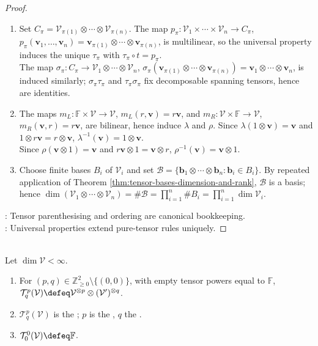 \begin{theorem}
\begin{proof}
\begin{enumerate}[label=(\roman*)]
\item Set $C_\pi=\mathcal{V}_{\pi(1)}\otimes\cdots\otimes\mathcal{V}_{\pi(n)}$. The map $p_\pi:\mathcal{V}_1\times\cdots\times\mathcal{V}_n\to C_\pi$, $p_\pi(\mathbf{v}_1,\ldots,\mathbf{v}_n)=\mathbf{v}_{\pi(1)}\otimes\cdots\otimes\mathbf{v}_{\pi(n)}$, is multilinear, so the universal property induces the unique $\tau_\pi$ with $\tau_\pi\circ t=p_\pi$.\\
The map $\sigma_\pi:C_\pi\to\mathcal{V}_1\otimes\cdots\otimes\mathcal{V}_n$, $\sigma_\pi(\mathbf{v}_{\pi(1)}\otimes\cdots\otimes\mathbf{v}_{\pi(n)})=\mathbf{v}_1\otimes\cdots\otimes\mathbf{v}_n$, is induced similarly; $\sigma_\pi\tau_\pi$ and $\tau_\pi\sigma_\pi$ fix decomposable spanning tensors, hence are identities.
\item The maps $m_L:\mathbb{F}\times\mathcal{V}\to\mathcal{V}$, $m_L(r,\mathbf{v})=r\mathbf{v}$, and $m_R:\mathcal{V}\times\mathbb{F}\to\mathcal{V}$, $m_R(\mathbf{v},r)=r\mathbf{v}$, are bilinear, hence induce $\lambda$ and $\rho$. Since $\lambda(1\otimes\mathbf{v})=\mathbf{v}$ and $1\otimes r\mathbf{v}=r\otimes\mathbf{v}$, $\lambda^{-1}(\mathbf{v})=1\otimes\mathbf{v}$.\\
Since $\rho(\mathbf{v}\otimes1)=\mathbf{v}$ and $r\mathbf{v}\otimes1=\mathbf{v}\otimes r$, $\rho^{-1}(\mathbf{v})=\mathbf{v}\otimes1$.
\item Choose finite bases $B_i$ of $\mathcal{V}_i$ and set $\mathcal{B}=\{\mathbf{b}_1\otimes\cdots\otimes\mathbf{b}_n:\mathbf{b}_i\in B_i\}$. By repeated application of Theorem \ref{thm:tensor-bases-dimension-and-rank}, $\mathcal{B}$ is a basis; hence $\dim(\mathcal{V}_1\otimes\cdots\otimes\mathcal{V}_n)=\#\mathcal{B}=\prod_{i=1}^{n}\#B_i=\prod_{i=1}^{n}\dim\mathcal{V}_i$.
\end{enumerate}
: Tensor parenthesising and ordering are canonical bookkeeping.\\
: Universal properties extend pure-tensor rules uniquely.
\end{proof}
\end{theorem}

\begin{definition} \label{def:tensor-spaces-type-pq} \\
Let $\dim\mathcal{V}<\infty$.
\begin{enumerate}[label=(\roman*)]
\setlength{\itemsep}{0pt}
\item For $(p,q)\in\mathbb{Z}_{\geq0}^{2}\setminus\{(0,0)\}$, with empty tensor powers equal to $\mathbb{F}$, $\mathcal{T}^{p}_{q}(\mathcal{V})\defeq\mathcal{V}^{\otimes p}\otimes(\mathcal{V}')^{\otimes q}$.
\item $\mathcal{T}^{p}_{q}(\mathcal{V})$ is the ; $p$ is the , $q$ the .
\item $\mathcal{T}^{0}_{0}(\mathcal{V})\defeq\mathbb{F}$.
\end{enumerate}
\end{definition}

